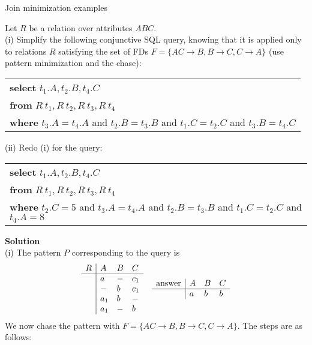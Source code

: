 
\begin{center}
{\Large Join minimization examples} \\
\end{center}



\vspace{4mm}
\noindent
Let $R$ be a relation over attributes $ABC$. \\ 
(i) Simplify the following
conjunctive SQL query, knowing that it is applied only to relations $R$ satisfying the set of FDs
$F = \{AC \rightarrow B, B \rightarrow C, C \rightarrow A\}$ (use pattern minimization and
 the chase):

\vspace{1cm}
\begin{tabular}{l}
{\bf select} $t_1.A, t_2.B, t_4.C$ \\
{\bf from} $R~ t_1, R~ t_2, R~ t_3, R~ t_4$ \\
{\bf where} $t_3.A = t_4.A$ and $t_2.B = t_3.B$ and $t_1.C = t_2.C$ and $t_3.B = t_4.C$ \\
\end{tabular}
\vspace{1cm}

(ii) Redo (i) for the query:

\vspace{1cm}

\begin{tabular}{l}
{\bf select} $t_1.A, t_2.B, t_4.C$ \\
{\bf from} $R~ t_1, R~ t_2, R~ t_3, R~ t_4$ \\
{\bf where} $t_2.C = 5$ and $t_3.A = t_4.A$ and $t_2.B = t_3.B$ and $t_1.C = t_2.C$ and $t_4.A = 8$ 
\end{tabular}


\vspace{4mm}
\noindent
{\bf Solution} \\
(i) The pattern $P$ corresponding to the query is
$$
\begin{array}{ll}
\begin{array}{l|lll} 
R & A & B & C \\ \hline
& a & - & c_1 \\
& - & b & c_1 \\
& a_1 & b & - \\
& a_1 & - & b \\ 
\end{array} &
\begin{array}{l|lll}
\mbox{answer} & A & B & C \\ \hline
&  a & b & b \\
\end{array}
\end{array}
$$
We now chase the pattern with $F = \{AC \rightarrow B, B \rightarrow C, C \rightarrow A\}$. The steps are as follows:

